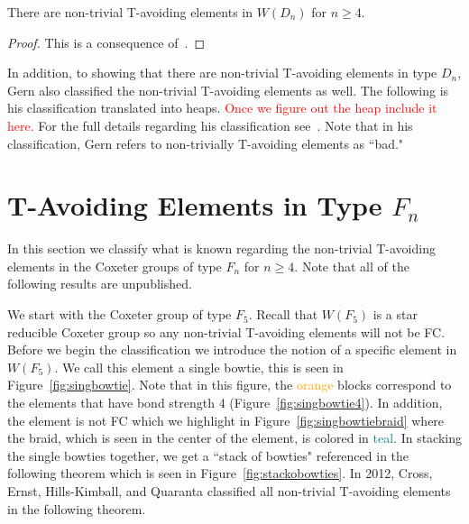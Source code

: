\begin{theorem}
 There are non-trivial T-avoiding elements in $W(D_n)$ for $n \geq 4$.
\begin{proof}
	This is a consequence of~\cite[Section 2.2]{Gern2013a}.
\end{proof}
\end{theorem}

In addition, to showing that there are non-trivial T-avoiding elements in type $D_n$, Gern also classified the non-trivial T-avoiding elements as well. The following is his classification translated into heaps. \textcolor{red}{Once we figure out the heap include it here.} For the full details regarding his classification see~\cite{Gern2013a}. Note that in his classification, Gern  refers to non-trivially T-avoiding elements as ``bad."


\section{T-Avoiding Elements in Type $F_n$}

In this section we classify what is known regarding the non-trivial T-avoiding elements in the Coxeter groups of type $F_n$ for $n \geq 4$. Note that all of the following results are unpublished. %

We start with the Coxeter group of type $F_5$.  Recall that $W(F_5)$ is a star reducible Coxeter group so any non-trivial T-avoiding elements will not be FC. Before we begin the classification we introduce the notion of a specific element in $W(F_5)$.  We call this element a single bowtie, this is seen in Figure~\ref{fig:singbowtie}. Note that in this figure, the \textcolor{orange}{orange} blocks correspond to the elements that have bond strength 4 (Figure~\ref{fig:singbowtie4}). In addition, the element is not FC which we highlight in Figure~\ref{fig:singbowtiebraid} where the braid, which is seen in the center of the element, is colored in \textcolor{teal}{teal}. In stacking the single bowties together, we get a ``stack of bowties" referenced in the following theorem which is seen in Figure~\ref{fig:stackobowties}. In 2012, Cross, Ernst, Hills-Kimball, and Quaranta classified all non-trivial T-avoiding elements in the following theorem.

